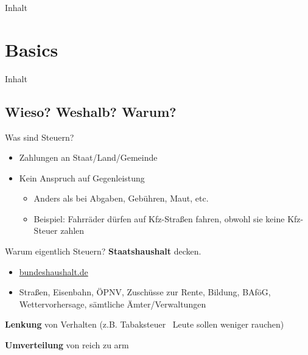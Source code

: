 \documentclass{beamer}
\begin{document}
	\begin{frame}[t]{Inhalt}
		\tableofcontents[hidesubsections]
	\end{frame}
	
	\section{Basics}
	
		\begin{frame}[t]{Inhalt}
		\end{frame}
	
		\subsection{Wieso? Weshalb? Warum?}
	
			\begin{frame}{Was sind Steuern?}
				\begin{itemize}
					\item Zahlungen an Staat/Land/Gemeinde
					\item Kein Anspruch auf Gegenleistung
					\begin{itemize}
						\item Anders als bei Abgaben, Gebühren, Maut, etc.
						\item Beispiel: Fahrräder dürfen auf Kfz-Straßen fahren, obwohl sie keine Kfz-Steuer zahlen
					\end{itemize}
				\end{itemize}
			\end{frame}
		
			\begin{frame}{Warum eigentlich Steuern?}
				\textbf{Staatshaushalt} decken.
				\begin{itemize}
					\item \href{https://www.bundeshaushalt.de/DE/Bundeshaushalt-digital/bundeshaushalt-digital.html}{bundeshaushalt.de}
					\item Straßen, Eisenbahn, ÖPNV, Zuschüsse zur Rente, Bildung, BAföG, Wettervorhersage, sämtliche Ämter/Verwaltungen
				\end{itemize}
			
				\textbf{Lenkung} von Verhalten (z.B. Tabaksteuer \textrightarrow\ Leute sollen weniger rauchen)
				
				\textbf{Umverteilung} von reich zu arm
			\end{frame}
			
\end{document}

